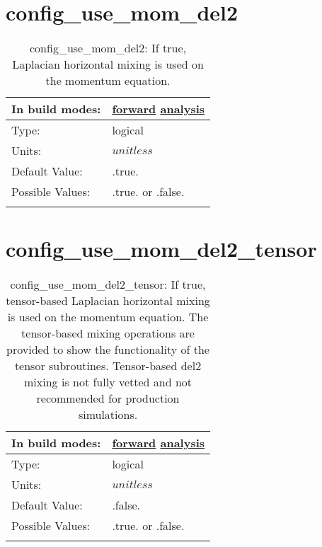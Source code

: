 \section[config\_use\_mom\_del2]{config\_use\_mom\_del2}
\label{sec:nm_sec_config_use_mom_del2}
\begin{center}
\begin{longtable}{| p{2.0in} || p{4.0in} |}
    \hline
    In build modes: & \hyperref[subsec:forward_nm_tab_hmix_del2]{forward} \hyperref[subsec:analysis_nm_tab_hmix_del2]{analysis} \\
    \hline
    Type: & logical \\
    \hline
    Units: & $unitless$ \\
    \hline
    Default Value: & .true. \\
    \hline
    Possible Values: & .true. or .false. \\
    \hline
    \caption{config\_use\_mom\_del2: If true, Laplacian horizontal mixing is used on the momentum equation.}
\end{longtable}
\end{center}
\section[config\_use\_mom\_del2\_tensor]{config\_use\_mom\_del2\_tensor}
\label{sec:nm_sec_config_use_mom_del2_tensor}
\begin{center}
\begin{longtable}{| p{2.0in} || p{4.0in} |}
    \hline
    In build modes: & \hyperref[subsec:forward_nm_tab_hmix_del2_tensor]{forward} \hyperref[subsec:analysis_nm_tab_hmix_del2_tensor]{analysis} \\
    \hline
    Type: & logical \\
    \hline
    Units: & $unitless$ \\
    \hline
    Default Value: & .false. \\
    \hline
    Possible Values: & .true. or .false. \\
    \hline
    \caption{config\_use\_mom\_del2\_tensor: If true, tensor-based Laplacian horizontal mixing is used on the momentum equation.  The tensor-based mixing operations are provided to show the functionality of the tensor subroutines.  Tensor-based del2 mixing is not fully vetted and not recommended for production simulations.}
\end{longtable}
\end{center}
